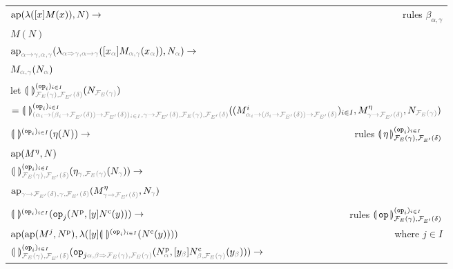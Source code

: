 \begin{sidewaysfigure}
  \centering
  \begin{tabular}{lr}
  $\operatorname{ap}(\lambda([x]M(x)), N) \to$ & rules $\beta_{\alpha,\gamma}$ \\
  $M (N)$ & \\
  \multicolumn{2}{l}{$\aps_{\typehint{\alpha \to \gamma, \alpha, \gamma}}(\lambda_{\typehint{\alpha \To \gamma, \alpha \to \gamma}}([x_{\typehint\alpha}]M_{\typehint{\alpha, \gamma}}(x_{\typehint\alpha})), N_{\typehint\alpha}) \to$} \\
  \multicolumn{2}{l}{$M_{\typehint{\alpha, \gamma}}(N_{\typehint\alpha})$} \\
  \\
  let $\banana{}^{(\op{op}_i)_{i \in
    I}}_{\typehint{\FF_E(\gamma),\FF_{E'}(\delta)}}(N_{\typehint{\FF_E(\gamma)}})$ & \\
  \multicolumn{2}{l}{$ = \banana{}^{(\op{op}_i)_{i \in I}}_{\typehint{(\alpha_i \to (\beta_i \to \FF_{E'}(\delta)) \to
  \FF_{E'}(\delta))_{i \in I}, \gamma \to \FF_{E'}(\delta), \FF_E(\gamma),
  \FF_{E'}(\delta)}} ((M^i_{\typehint{\alpha_i \to (\beta_i \to
    \FF_{E'}(\delta)) \to \FF_{E'}(\delta)}})_{i \in I},
    M^\eta_{\typehint{\gamma \to \FF_{E'}(\delta)}}, N_{\typehint{\FF_E(\gamma)}})$} \\
  \\
  $\llparenthesis \,  \, \rrparenthesis^{(\mathtt{op}_i)_{i \in I}} (\eta (N)) \to$ & rules $\llparenthesis \, \eta \, \rrparenthesis^{(\mathtt{op}_i)_{i \in I}}_{\mathcal{F}_E(\gamma),\mathcal{F}_{E'}(\delta)}$ \\
  $\operatorname{ap}(M^\eta, N)$ & \\
  \multicolumn{2}{l}{$\banana{}^{(\op{op}_i)_{i \in I}}_{\typehint{\FF_E(\gamma), \FF_{E'}(\delta)}} (\eta_{\typehint{\gamma, \FF_E(\gamma)}} (N_{\typehint{\gamma}})) \to$} \\
  \multicolumn{2}{l}{$\aps_{\typehint{\gamma \to \FF_{E'}(\delta), \gamma,
  \FF_{E'}(\delta)}} (M^\eta_{\typehint{\gamma \to \FF_{E'}(\delta)}}, N_{\typehint{\gamma}})$} \\
  \\
  $\llparenthesis \,  \, \rrparenthesis^{(\mathtt{op}_i)_{i \in I}} (\mathtt{op}_j (N^{\mathrm{p}}, [y] N^{\mathrm{c}}(y))) \to$ & rules $\llparenthesis \, \mathtt{op} \, \rrparenthesis^{(\mathtt{op}_i)_{i \in I}}_{\mathcal{F}_E(\gamma),\mathcal{F}_{E'}(\delta)}$ \\
  $\operatorname{ap}(\operatorname{ap}(M^j, N^{\mathrm{p}}), \lambda([y] \llparenthesis \,  \, \rrparenthesis^{(\mathtt{op}_i)_{i \in I}} (N^{\mathrm{c}}(y))))$ & where $j \in I$ \\
  \multicolumn{2}{l}{$\banana{}^{(\op{op}_i)_{i \in I}}_{\typehint{\FF_E(\gamma), \FF_{E'}(\delta)}} (\op{op}_{j \typehint{\alpha, \beta \To \FF_E(\gamma), \FF_E(\gamma)}} (N^{\mathrm{p}}_{\typehint{\alpha}}, [y_{\typehint{\beta}}] N^{\mathrm{c}}_{\typehint{\beta, \FF_E(\gamma)}}(y_{\typehint{\beta}}))) \to$} \\

\end{tabular}
\end{sidewaysfigure}
